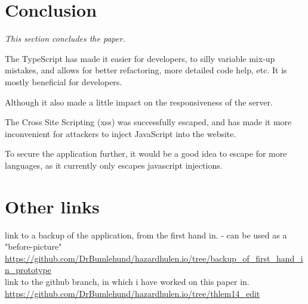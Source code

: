 \documentclass[a4paper]{article}
\begin{document}


\section{Conclusion}
\textit{This section concludes the paper.}

The TypeScript has made it easier for developers, to silly variable mix-up mistakes, and allows for better refactoring, more detailed code help, etc. It is mostly beneficial for developers.

Although it also made a little impact on the responsiveness of the server.

The Cross Site Scripting (xss) was successfully escaped, and has made it more inconvenient for attackers to inject JavaScript into the website.

To secure the application further, it would be a good idea to escape for more languages, as it currently only escapes javascript injections.

\label{page_b4_appendices}




\clearpage
{}
\setcounter{page}{1}
\rfoot{ }



\listoffigures
\listoflistings

\section*{Other links}
link to a backup of the application, from the first hand in. - can be used as a "before-picture"\\
\url{https://github.com/DrBumlehund/hazardhulen.io/tree/backup_of_first_hand_in_prototype}\\

link to the github branch, in which i have worked on this paper in.\\
\url{https://github.com/DrBumlehund/hazardhulen.io/tree/thlem14_edit}


\end{document}

